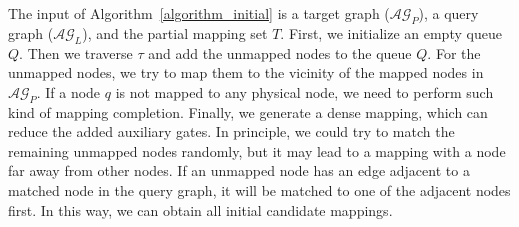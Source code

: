 \documentclass[runningheads]{llncs}
\begin{document}
The input of Algorithm~\ref{algorithm_initial} is a target graph ($\mathcal{AG}_{P}$), a query graph ($\mathcal{AG}_{L}$), and the partial mapping set $T$. First, we initialize an empty queue $Q$.
Then we traverse $\tau$ and add the unmapped nodes to the queue $Q$. For the unmapped nodes, we try to map them to the vicinity of the mapped nodes in $\mathcal{AG}_{P}$. If a node $\textit{q}$ is not mapped to any physical node, we need to perform such kind of mapping completion. Finally, we generate a dense mapping, which can reduce the added auxiliary gates. In principle, we could try to match the remaining unmapped nodes randomly, but it may lead to a mapping with a node far away from other nodes. If an unmapped node has an edge adjacent to a matched node in the query graph, it will be matched to one of the adjacent nodes first.  In this way, we can obtain all initial candidate mappings.
\end{document}
